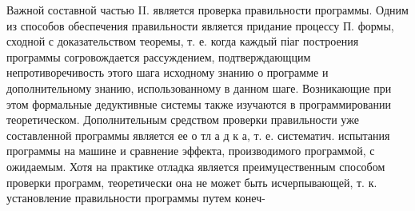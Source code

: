\documentclass[10pt]{article}
\begin{document}
Важной составной частью II. является проверка правильности программы. Одним из способов обеспечения правильности является придание процессу П. формы, сходной с доказательством теоремы, т. е. когда каждый піаг построения программы согровождается рассуждением, подтверждающцим непротиворечивость этого шага исходному знанию о программе и дополнительному знанию, использованному в данном шаге. Возникающие при этом формальные дедуктивные системы также изучаются в программировании теоретическом. Дополнительным средством проверки правильности уже составленной программы является ее о тл а д к а, т. е. систематич. испытания программы на машине и сравнение эффекта, производимого программой, с ожидаемым. Хотя на практике отладка является преимуцественным способом проверки программ, теоретически она не может быть исчерпывающей, т. к. установление правильности программы путем конеч-
\end{document}
